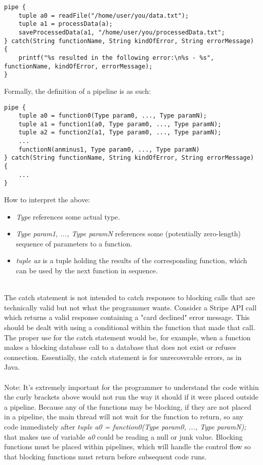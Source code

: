 \documentclass[./LRM_main.tex]{subfiles}
\begin{document}
\begin{lstlisting}
pipe {
	tuple a0 = readFile("/home/user/you/data.txt"); 
 	tuple a1 = processData(a); 
	saveProcessedData(a1, "/home/user/you/processedData.txt";
} catch(String functionName, String kindOfError, String errorMessage) {
    printf("%s resulted in the following error:\n%s - %s", functionName, kindOfError, errorMessage);
}
\end{lstlisting}
Formally, the definition of a pipeline is as such:
\begin{lstlisting}
pipe {
	tuple a0 = function0(Type param0, ..., Type paramN); 
	tuple a1 = function1(a0, Type param0, ..., Type paramN); 
	tuple a2 = function2(a1, Type param0, ..., Type paramN);
	... 
	functionN(anminus1, Type param0, ..., Type paramN)
} catch(String functionName, String kindOfError, String errorMessage) {
    ...
}
\end{lstlisting}
How to interpret the above:\\
\begin{itemize}
    \item \textit{Type} references some actual type.\\
    \item \textit{Type param1, ..., Type paramN} references some (potentially zero-length) sequence of parameters to a function.\\
    \item \textit{tuple ax} is a tuple holding the results of the corresponding function, which can be used by the next function in sequence.\\\\
\end{itemize}
The catch statement is not intended to catch responses to blocking calls that are technically valid but not what the programmer wants. Consider a Stripe API call which returns a valid response
containing a "card declined" error message. This should be dealt with using a conditional within the function that made that call. The proper use for the catch statement would be, for example,
when a function makes a blocking database call to a database that does not exist or refuses connection. Essentially, the catch statement is for unrecoverable errors, as in Java.\\\\
Note: It's extremely important for the programmer to understand the code within the curly brackets above would not run the way it should if it were placed outside a pipeline. Because any of the functions
may be blocking, if they are not placed in a pipeline, the main thread will not wait for the function to return, so any code immediately after \textit{tuple a0 = function0(Type param0, ..., Type
paramN);} that makes use of variable \textit{a0} could be reading a null or junk value. Blocking functions must be placed within pipelines, which will handle the control flow so that blocking functions must return before subsequent code runs.
\end{document}
